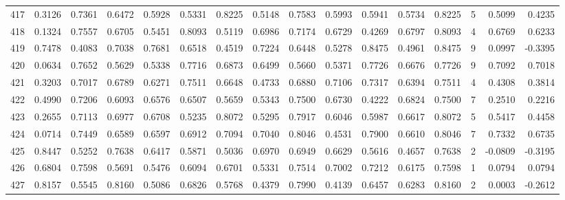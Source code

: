 \begin{tabular}{lrrrrrrrrrrrrrrr}
417 &      0.3126 &  0.7361 &  0.6472 &  0.5928 &  0.5331 &  0.8225 &  0.5148 &  0.7583 &  0.5993 &  0.5941 &   0.5734 &     0.8225 &      5 &                    0.5099 &                     0.4235 \\
418 &      0.1324 &  0.7557 &  0.6705 &  0.5451 &  0.8093 &  0.5119 &  0.6986 &  0.7174 &  0.6729 &  0.4269 &   0.6797 &     0.8093 &      4 &                    0.6769 &                     0.6233 \\
419 &      0.7478 &  0.4083 &  0.7038 &  0.7681 &  0.6518 &  0.4519 &  0.7224 &  0.6448 &  0.5278 &  0.8475 &   0.4961 &     0.8475 &      9 &                    0.0997 &                    -0.3395 \\
420 &      0.0634 &  0.7652 &  0.5629 &  0.5338 &  0.7716 &  0.6873 &  0.6499 &  0.5660 &  0.5371 &  0.7726 &   0.6676 &     0.7726 &      9 &                    0.7092 &                     0.7018 \\
421 &      0.3203 &  0.7017 &  0.6789 &  0.6271 &  0.7511 &  0.6648 &  0.4733 &  0.6880 &  0.7106 &  0.7317 &   0.6394 &     0.7511 &      4 &                    0.4308 &                     0.3814 \\
422 &      0.4990 &  0.7206 &  0.6093 &  0.6576 &  0.6507 &  0.5659 &  0.5343 &  0.7500 &  0.6730 &  0.4222 &   0.6824 &     0.7500 &      7 &                    0.2510 &                     0.2216 \\
423 &      0.2655 &  0.7113 &  0.6977 &  0.6708 &  0.5235 &  0.8072 &  0.5295 &  0.7917 &  0.6046 &  0.5987 &   0.6617 &     0.8072 &      5 &                    0.5417 &                     0.4458 \\
424 &      0.0714 &  0.7449 &  0.6589 &  0.6597 &  0.6912 &  0.7094 &  0.7040 &  0.8046 &  0.4531 &  0.7900 &   0.6610 &     0.8046 &      7 &                    0.7332 &                     0.6735 \\
425 &      0.8447 &  0.5252 &  0.7638 &  0.6417 &  0.5871 &  0.5036 &  0.6970 &  0.6949 &  0.6629 &  0.5616 &   0.4657 &     0.7638 &      2 &                   -0.0809 &                    -0.3195 \\
426 &      0.6804 &  0.7598 &  0.5691 &  0.5476 &  0.6094 &  0.6701 &  0.5331 &  0.7514 &  0.7002 &  0.7212 &   0.6175 &     0.7598 &      1 &                    0.0794 &                     0.0794 \\
427 &      0.8157 &  0.5545 &  0.8160 &  0.5086 &  0.6826 &  0.5768 &  0.4379 &  0.7990 &  0.4139 &  0.6457 &   0.6283 &     0.8160 &      2 &                    0.0003 &                    -0.2612 \\

\end{tabular}
